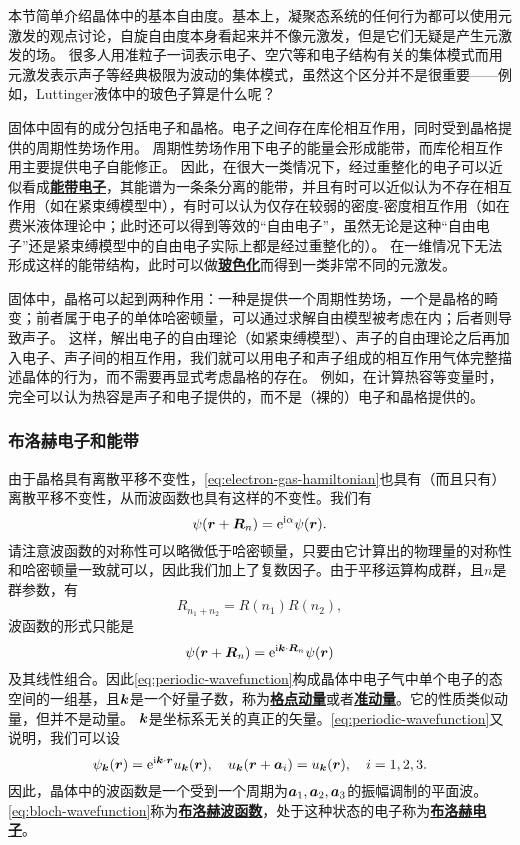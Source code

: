 \documentclass[hyperref, UTF8, a4paper]{ctexart}
\newcommand*{\ii}{\mathrm{i}}
\newcommand*{\ee}{\mathrm{e}}
\newcommand*{\concept}[1]{\underline{\textbf{#1}}}
\begin{document}
本节简单介绍晶体中的基本自由度。基本上，凝聚态系统的任何行为都可以使用元激发的观点讨论，自旋自由度本身看起来并不像元激发，但是它们无疑是产生元激发的场。
很多人用准粒子一词表示电子、空穴等和电子结构有关的集体模式而用元激发表示声子等经典极限为波动的集体模式，虽然这个区分并不是很重要——例如，Luttinger液体中的玻色子算是什么呢？

固体中固有的成分包括电子和晶格。电子之间存在库伦相互作用，同时受到晶格提供的周期性势场作用。
周期性势场作用下电子的能量会形成能带，而库伦相互作用主要提供电子自能修正。
因此，在很大一类情况下，经过重整化的电子可以近似看成\concept{能带电子}，其能谱为一条条分离的能带，并且有时可以近似认为不存在相互作用（如在紧束缚模型中），有时可以认为仅存在较弱的密度-密度相互作用（如在费米液体理论中；此时还可以得到等效的“自由电子”，虽然无论是这种“自由电子”还是紧束缚模型中的自由电子实际上都是经过重整化的）。
在一维情况下无法形成这样的能带结构，此时可以做\concept{玻色化}而得到一类非常不同的元激发。

固体中，晶格可以起到两种作用：一种是提供一个周期性势场，一个是晶格的畸变；前者属于电子的单体哈密顿量，可以通过求解自由模型被考虑在内；后者则导致声子。
这样，解出电子的自由理论（如紧束缚模型）、声子的自由理论之后再加入电子、声子间的相互作用，我们就可以用电子和声子组成的相互作用气体完整描述晶体的行为，而不需要再显式考虑晶格的存在。
例如，在计算热容等变量时，完全可以认为热容是声子和电子提供的，而不是（裸的）电子和晶格提供的。

\subsubsection{布洛赫电子和能带}\label{sec:energy-band}

由于晶格具有离散平移不变性，\eqref{eq:electron-gas-hamiltonian}也具有（而且只有）离散平移不变性，从而波函数也具有这样的不变性。我们有
\[
    \psi(\vb*{r}+\vb*{R}_n) = \ee^{\ii \alpha} \psi(\vb*{r}).
\]
请注意波函数的对称性可以略微低于哈密顿量，只要由它计算出的物理量的对称性和哈密顿量一致就可以，因此我们加上了复数因子。由于平移运算构成群，且$n$是群参数，有
\[
    R_{n_1+n_2} = R(n_1) R(n_2),
\]
波函数的形式只能是
\begin{equation}
    \psi(\vb*{r}+\vb*{R}_n) = \ee^{\ii \vb*{k} \cdot \vb*{R}_n} \psi(\vb*{r})
    \label{eq:periodic-wavefunction}
\end{equation}
及其线性组合。因此\eqref{eq:periodic-wavefunction}构成晶体中电子气中单个电子的态空间的一组基，且$\vb*{k}$是一个好量子数，称为\concept{格点动量}或者\concept{准动量}。它的性质类似动量，但并不是动量。
$\vb*{k}$是坐标系无关的真正的矢量。\eqref{eq:periodic-wavefunction}又说明，我们可以设
\begin{equation}
    \psi_{\vb*{k}}(\vb*{r}) = \ee^{\ii \vb*{k} \cdot \vb*{r}} u_{\vb*{k}}(\vb*{r}), \quad u_{\vb*{k}}(\vb*{r}+\vb*{a}_i) = u_{\vb*{k}}(\vb*{r}), \quad i = 1, 2, 3.
    \label{eq:bloch-wavefunction}
\end{equation}
因此，晶体中的波函数是一个受到一个周期为$\vb*{a}_1,\vb*{a}_2, \vb*{a}_3$的振幅调制的平面波。
\eqref{eq:bloch-wavefunction}称为\concept{布洛赫波函数}，处于这种状态的电子称为\concept{布洛赫电子}。
\end{document}
